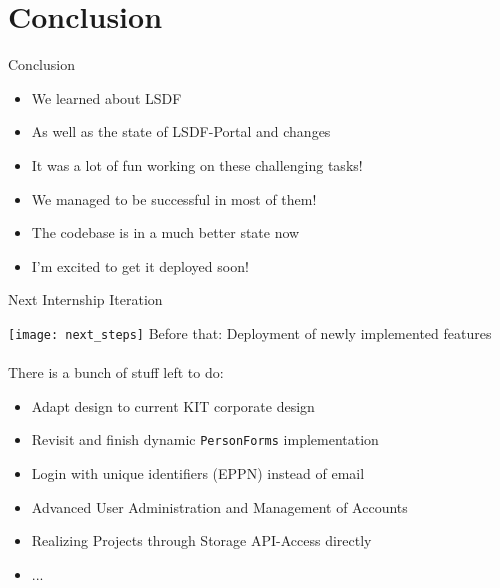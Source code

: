 \section{Conclusion}


\begin{frame}[c]{Conclusion}
    \large
    \begin{itemize}[<+(1)->]
        \item We learned about LSDF
        \item As well as the state of LSDF-Portal and changes
        \item It was a lot of fun working on these challenging tasks!
        \item We managed to be successful in most of them!
        \item The codebase is in a much better state now
        \item I'm excited to get it deployed soon!
    \end{itemize}
\end{frame}

\begin{frame}[c]{Next Internship Iteration}
    \begin{multicols}{2}
        \texttt{[image: next\_steps]}
    Before that: Deployment of newly implemented features \\
    \pause
        \phantom{M} \\
    There is a bunch of stuff left to do:
    \begin{itemize}[<+(1)->]
        \item Adapt design to current KIT corporate design
        \item Revisit and finish dynamic \texttt{PersonForms} implementation
        \item Login with unique identifiers (EPPN) instead of email
        \item Advanced User Administration and Management of Accounts
        \item Realizing Projects through Storage API-Access directly
        \item ...
    \end{itemize}
    \end{multicols}
\end{frame}
